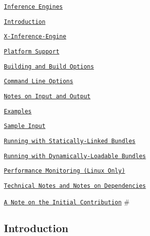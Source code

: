 
\begin{DoxyItemize}
\item \href{#inference-engines}{\tt Inference Engines}
\begin{DoxyItemize}
\item \href{#introduction}{\tt Introduction}
\item \href{#x-inference-engine}{\tt X-\/\+Inference-\/\+Engine}
\begin{DoxyItemize}
\item \href{#platform-support}{\tt Platform Support}
\item \href{#building-and-build-options}{\tt Building and Build Options}
\item \href{#command-line-options}{\tt Command Line Options}
\begin{DoxyItemize}
\item \href{#notes-on-input-and-output}{\tt Notes on Input and Output}
\end{DoxyItemize}
\item \href{#examples}{\tt Examples}
\begin{DoxyItemize}
\item \href{#sample-input}{\tt Sample Input}
\item \href{#running-with-statically-linked-bundles}{\tt Running with Statically-\/\+Linked Bundles}
\item \href{#running-with-dynamically-loadable-bundles}{\tt Running with Dynamically-\/\+Loadable Bundles}
\item \href{#performance-monitoring-linux-only}{\tt Performance Monitoring (Linux Only)}
\end{DoxyItemize}
\item \href{#technical-notes-and-notes-on-dependencies}{\tt Technical Notes and Notes on Dependencies}
\item \href{#a-note-on-the-initial-contribution}{\tt A Note on the Initial Contribution} \#
\end{DoxyItemize}
\end{DoxyItemize}
\end{DoxyItemize}

\subsection*{Introduction}


